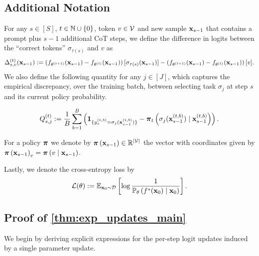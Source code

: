 \documentclass{article}
\theoremstyle{plain}
\theoremstyle{definition}
\theoremstyle{remark}
\begin{document}
\subsection{Additional Notation}
For any $s\in[S]$, $t \in \mathbb{N} \cup \{0\}$, token $v\in \mathcal{V}$ and new sample $\mathbf{x}_{s-1}$ that contains a prompt plus $s-1$ additional CoT steps, we define the difference in logits between the ``correct tokens'' $\sigma_{\tau(s)}$ and $v$ as
\begin{align}\label{def: Delta}
        \Delta^{(t)}_{s, v}( \mathbf{x}_{s-1}) := \left(f_{\theta^{(t+1)}}( \mathbf{x}_{s-1}) - f_{\theta^{(t)}}( \mathbf{x}_{s-1})\right)[\sigma_{\tau(s)}( \mathbf{x}_{s-1})]  - \left(f_{\theta^{(t+1)}}( \mathbf{x}_{s-1}) - f_{\theta^{(t)}}( \mathbf{x}_{s-1})\right)[v].
\end{align}
We also define the following quantity for any $j\in[J]$, which captures the empirical discrepancy, over the training batch,
between selecting task $\sigma_j$ at step $s$ and its current policy probability.

\begin{align}\label{def: Q}
    Q^{(t)}_{s, j} := \frac{1}{B}\sum_{b=1}^B \left(\boldsymbol{1}_{\{ y_{s}^{(t, b)} = \sigma_j(\mathbf{x}_{s-1}^{(t, b)}) \}} 
    - \boldsymbol{\pi}_t\left(\sigma_j(\mathbf{x}_{s-1}^{(t, b)}) \mid \mathbf{x}_{s-1}^{(t, b)}\right)\right).
\end{align}

For a policy $\boldsymbol{\pi}$ we denote by $\boldsymbol{\pi}\left(\mathbf{x}_{s-1}\right) \in \mathbb{R}^{\left| \mathcal{V} \right|}$ the vector with coordinates given by $\boldsymbol{\pi}\left(\mathbf{x}_{s-1}\right)_v = \boldsymbol{\pi}\left(v \mid \mathbf{x}_{s-1}\right)$.

Lastly, we denote the cross-entropy loss by
\begin{align*}
    \mathcal{L}(\theta) := \mathbb{E}_{\mathbf{x}_0 \sim \mathcal{D}}\left[\log \frac{1}{\mathbb{P}_\theta\left( f^*(\mathbf{x}_0) \mid \mathbf{x}_0 \right)}\right].
\end{align*}

\subsection{Proof of \cref{thm:exp_updates_main}}
We begin by deriving explicit expressions for the per-step logit updates induced by a single parameter update.
\end{document}

